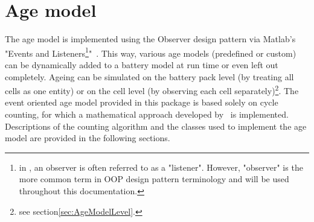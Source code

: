 \section{Age model}
\label{sec:ageModel}
The age model is implemented using the Observer design pattern via Matlab's "Events and Listeners\footnote{in \matlab, an observer is often referred to as a "listener". However, "observer" is the more common term in OOP design pattern terminology and will be used throughout this documentation.}"~\cite{_overview_????}. This way, various age models (predefined or custom) can be dynamically added to a battery model at run time or even left out completely. Ageing can be simulated on the battery pack level (by treating all cells as one entity) or on the cell level (by observing each cell separately)\footnote{see section\ref{sec:AgeModelLevel}.}. The event oriented age model provided in this package is based solely on cycle counting, for which a mathematical approach developed by~\cite{dambrowski_mathematical_2012} is implemented. Descriptions of the counting algorithm and the classes used to implement the age model are provided in the following sections.
